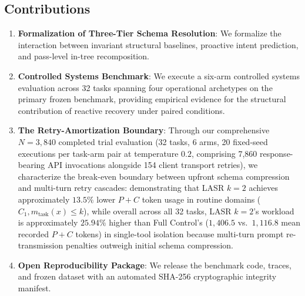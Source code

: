 \subsection{Contributions}
\begin{enumerate}
    \item \textbf{Formalization of Three-Tier Schema Resolution}: We formalize the interaction between invariant structural baselines, proactive intent prediction, and pass-level in-tree recomposition.
    \item \textbf{Controlled Systems Benchmark}: We execute a six-arm controlled systems evaluation across 32 tasks spanning four operational archetypes on the primary frozen benchmark, providing empirical evidence for the structural contribution of reactive recovery under paired conditions.
    \item \textbf{The Retry-Amortization Boundary}: Through our comprehensive $N=3,840$ completed trial evaluation (32 tasks, 6 arms, 20 fixed-seed executions per task-arm pair at temperature $0.2$, comprising 7,860 response-bearing API invocations alongside 154 client transport retries), we characterize the break-even boundary between upfront schema compression and multi-turn retry cascades: demonstrating that LASR $k=2$ achieves approximately $13.5\%$ lower $P+C$ token usage in routine domains ($C_1, m_{\text{task}}(x) \le k$), while overall across all 32 tasks, LASR $k=2$'s workload is approximately $25.94\%$ higher than Full Control's ($1,406.5$ vs.\ $1,116.8$ mean recorded $P+C$ tokens) in single-tool isolation because multi-turn prompt re-transmission penalties outweigh initial schema compression.
    \item \textbf{Open Reproducibility Package}: We release the benchmark code, traces, and frozen dataset with an automated SHA-256 cryptographic integrity manifest.
\end{enumerate}
